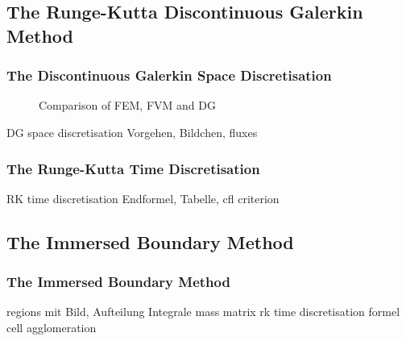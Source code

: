 	\subsection{The Runge-Kutta Discontinuous Galerkin Method}
	\begin{frame}
		\frametitle{The Discontinuous Galerkin Space Discretisation}
		\begin{figure}
			\centering
			\caption{Comparison of FEM, FVM and DG}
			\label{fig:1}
		\end{figure}

		DG space discretisation Vorgehen, Bildchen, fluxes
	\end{frame}
	\begin{frame}
		\frametitle{The Runge-Kutta Time Discretisation }
		RK time discretisation Endformel, Tabelle, cfl criterion
	\end{frame}
	\subsection{The Immersed Boundary Method}
	\begin{frame}
		\frametitle{The Immersed Boundary Method}
		regions mit Bild, Aufteilung Integrale
		mass matrix
		rk time discretisation formel
		cell agglomeration
	\end{frame}